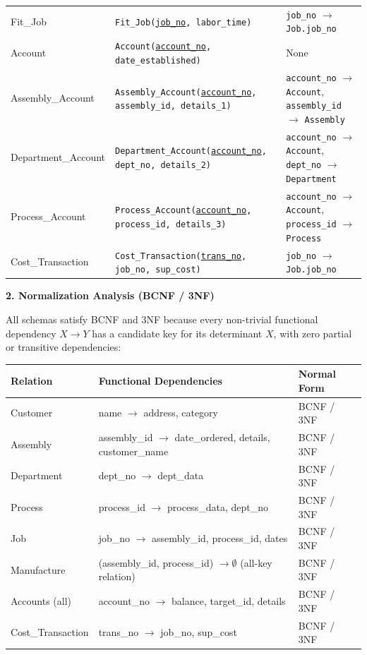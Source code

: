 \documentclass[10pt,letterpaper]{article}
\newcommand{\mysubsection}[1]{%
    \vspace{4pt}%
    {\normalsize\bfseries\color{titlecolor} #1}\par\vspace{2pt}%
}
\begin{document}
\begin{table}[H]
\begin{tabularx}{\textwidth}{p{2.5cm}Xp{4.4cm}}
Fit\_Job & \texttt{Fit\_Job(\underline{job\_no}, labor\_time)} & \texttt{job\_no} $\to$ \texttt{Job.job\_no} \\
Account & \texttt{Account(\underline{account\_no}, date\_established)} & None \\
Assembly\_Account & \texttt{Assembly\_Account(\underline{account\_no}, assembly\_id, details\_1)} & \texttt{account\_no} $\to$ \texttt{Account}, \texttt{assembly\_id} $\to$ \texttt{Assembly} \\
Department\_Account & \texttt{Department\_Account(\underline{account\_no}, dept\_no, details\_2)} & \texttt{account\_no} $\to$ \texttt{Account}, \texttt{dept\_no} $\to$ \texttt{Department} \\
Process\_Account & \texttt{Process\_Account(\underline{account\_no}, process\_id, details\_3)} & \texttt{account\_no} $\to$ \texttt{Account}, \texttt{process\_id} $\to$ \texttt{Process} \\
Cost\_Transaction & \texttt{Cost\_Transaction(\underline{trans\_no}, job\_no, sup\_cost)} & \texttt{job\_no} $\to$ \texttt{Job.job\_no} \\
\bottomrule
\end{tabularx}
\end{table}
\mysubsection{2. Normalization Analysis (BCNF / 3NF)}
\noindent All schemas satisfy BCNF and 3NF because every non-trivial functional dependency $X \to Y$ has a candidate key for its determinant $X$, with zero partial or transitive dependencies:\\[0.2cm]
\begin{table}[H]
\centering\small
\renewcommand{\arraystretch}{1.15}
\begin{tabular}{lll}
\toprule
\textbf{Relation} & \textbf{Functional Dependencies} & \textbf{Normal Form} \\
\midrule
Customer & name $\to$ address, category & BCNF / 3NF \\
Assembly & assembly\_id $\to$ date\_ordered, details, customer\_name & BCNF / 3NF \\
Department & dept\_no $\to$ dept\_data & BCNF / 3NF \\
Process & process\_id $\to$ process\_data, dept\_no & BCNF / 3NF \\
Job & job\_no $\to$ assembly\_id, process\_id, dates & BCNF / 3NF \\
Manufacture & (assembly\_id, process\_id) $\to \emptyset$ (all-key relation) & BCNF / 3NF \\
Accounts (all) & account\_no $\to$ balance, target\_id, details & BCNF / 3NF \\
Cost\_Transaction & trans\_no $\to$ job\_no, sup\_cost & BCNF / 3NF \\
\bottomrule
\end{tabular}
\end{table}
\label{sec:task2_end}
\end{document}
